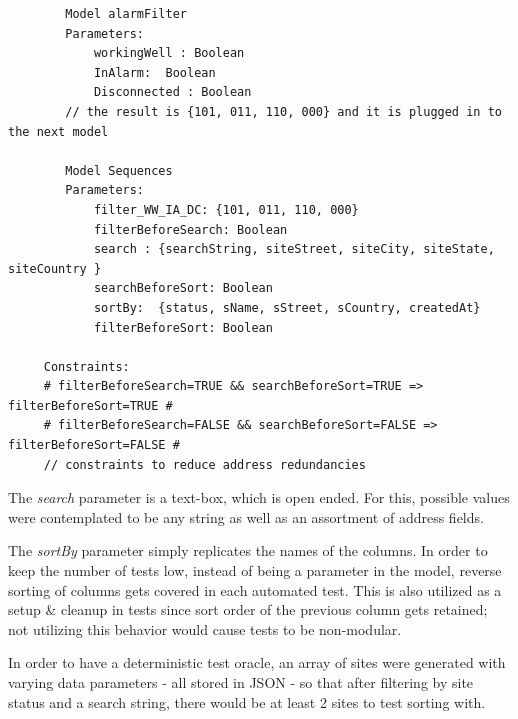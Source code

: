 \documentclass[conference]{IEEEtran}
\begin{document}
	\begin{lstlisting}
		Model alarmFilter
	 	Parameters:
			workingWell : Boolean
			InAlarm:  Boolean
			Disconnected : Boolean
		// the result is {101, 011, 110, 000} and it is plugged in to the next model 	

		Model Sequences
		Parameters:
			filter_WW_IA_DC: {101, 011, 110, 000}
			filterBeforeSearch: Boolean
			search : {searchString, siteStreet, siteCity, siteState, siteCountry }
			searchBeforeSort: Boolean
			sortBy:  {status, sName, sStreet, sCountry, createdAt}
			filterBeforeSort: Boolean
	 
	 Constraints:
	 # filterBeforeSearch=TRUE && searchBeforeSort=TRUE => filterBeforeSort=TRUE #
	 # filterBeforeSearch=FALSE && searchBeforeSort=FALSE => filterBeforeSort=FALSE #
	 // constraints to reduce address redundancies
	\end{lstlisting}


	The \textit{search} parameter is a text-box, which is open ended. For this, possible values were contemplated to be any string as well as an assortment of address fields.

	The \textit{sortBy} parameter simply replicates the names of the columns. 
	In order to keep the number of tests low, instead of being a parameter in the model, reverse sorting of columns gets covered in each automated test.
	This is also utilized as a setup \& cleanup in tests since sort order of the previous column gets retained; not utilizing this behavior  would cause tests to be non-modular.

	In order to have a deterministic test oracle, an array of sites were generated with varying data parameters - all stored in JSON - so that after filtering by site status and a search string, there would be at least 2 sites to test sorting with.
	
\end{document}
